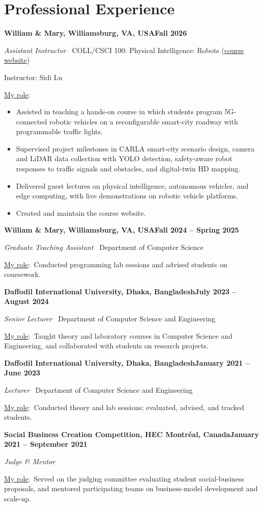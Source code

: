 \documentclass[11pt,letterpaper]{article}
\newcommand{\org}[2]{\par\textbf{#1}\hfill\textbf{#2}\par\nobreak\interlinepenalty=10000}
\newcommand{\myrole}{\underline{My role}:}
\newcommand{\entrygap}{\par\vspace{6pt}}
\begin{document}
\section{Professional Experience}
\org{William \& Mary, Williamsburg, VA, USA}{Fall 2026}
\textit{Assistant Instructor} \textbar\ COLL/CSCI 100: Physical Intelligence:
Robots (\href{https://roboworld314.github.io/VC_Lab/}{course website})\par\nobreak
Instructor: Sidi Lu\par\nobreak
\myrole
\begin{itemize}
  \item Assisted in teaching a hands-on course in which students program
    5G-connected robotic vehicles on a reconfigurable smart-city roadway with
    programmable traffic lights.
  \item Supervised project milestones in CARLA smart-city scenario design,
    camera and LiDAR data collection with YOLO detection, safety-aware robot
    responses to traffic signals and obstacles, and digital-twin HD mapping.
  \item Delivered guest lectures on physical intelligence, autonomous vehicles,
    and edge computing, with live demonstrations on robotic vehicle platforms.
  \item Created and maintain the course website.
\end{itemize}
\entrygap
\org{William \& Mary, Williamsburg, VA, USA}{Fall 2024 -- Spring 2025}
\textit{Graduate Teaching Assistant} \textbar\ Department of Computer Science\par\nobreak
\myrole\ Conducted programming lab sessions and advised students on coursework.
\entrygap
\org{Daffodil International University, Dhaka, Bangladesh}{July 2023 -- August 2024}
\textit{Senior Lecturer} \textbar\ Department of Computer Science and Engineering\par\nobreak
\myrole\ Taught theory and laboratory courses in Computer Science and
Engineering, and collaborated with students on research projects.
\entrygap
\org{Daffodil International University, Dhaka, Bangladesh}{January 2021 -- June 2023}
\textit{Lecturer} \textbar\ Department of Computer Science and Engineering\par\nobreak
\myrole\ Conducted theory and lab sessions; evaluated, advised, and tracked students.
\entrygap
\org{Social Business Creation Competition, HEC Montr\'eal, Canada}{January 2021 -- September 2021}
\textit{Judge \& Mentor}\par\nobreak
\myrole\ Served on the judging committee evaluating student social-business
proposals, and mentored participating teams on business-model development and scale-up.
\end{document}
